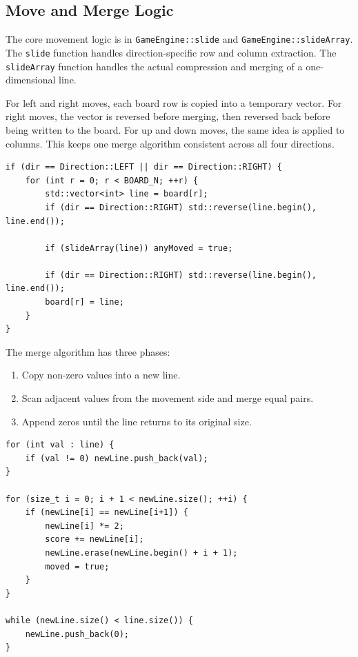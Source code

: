 \documentclass[a4paper,12pt]{article}
\begin{document}
\subsection{Move and Merge Logic}

The core movement logic is in \texttt{GameEngine::slide} and \texttt{GameEngine::slideArray}. The \texttt{slide} function handles direction-specific row and column extraction. The \texttt{slideArray} function handles the actual compression and merging of a one-dimensional line.

For left and right moves, each board row is copied into a temporary vector. For right moves, the vector is reversed before merging, then reversed back before being written to the board. For up and down moves, the same idea is applied to columns. This keeps one merge algorithm consistent across all four directions.

\begin{lstlisting}[style=CppStyle,caption={Using one-dimensional lines for row movement}]
if (dir == Direction::LEFT || dir == Direction::RIGHT) {
    for (int r = 0; r < BOARD_N; ++r) {
        std::vector<int> line = board[r];
        if (dir == Direction::RIGHT) std::reverse(line.begin(), line.end());

        if (slideArray(line)) anyMoved = true;

        if (dir == Direction::RIGHT) std::reverse(line.begin(), line.end());
        board[r] = line;
    }
}
\end{lstlisting}

The merge algorithm has three phases:

\begin{enumerate}
    \item Copy non-zero values into a new line.
    \item Scan adjacent values from the movement side and merge equal pairs.
    \item Append zeros until the line returns to its original size.
\end{enumerate}

\begin{lstlisting}[style=CppStyle,caption={Core merge algorithm}]
for (int val : line) {
    if (val != 0) newLine.push_back(val);
}

for (size_t i = 0; i + 1 < newLine.size(); ++i) {
    if (newLine[i] == newLine[i+1]) {
        newLine[i] *= 2;
        score += newLine[i];
        newLine.erase(newLine.begin() + i + 1);
        moved = true;
    }
}

while (newLine.size() < line.size()) {
    newLine.push_back(0);
}
\end{lstlisting}
\end{document}
